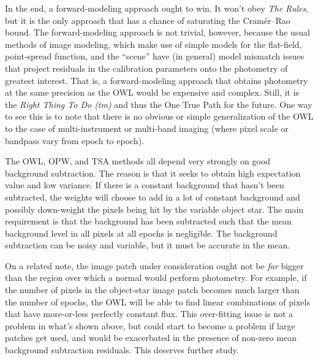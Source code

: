 \documentclass[12pt, letterpaper, preprint]{aastex}
\begin{document}
In the end, a forward-modeling approach ought to win.
It won't obey \emph{The Rules}, but it is the only approach that has a chance
  of saturating the Cram\'er--Rao bound.
The forward-modeling approach is not trivial, however,
  because the usual methods of image modeling,
  which make use of simple models for the flat-field, point-spread function,
  and the ``scene''
  have (in general) model mismatch issues that project residuals
  in the calibration parameters onto the photometry of greatest interest.
That is, a forward-modeling approach that obtains photometry at the same
  precision as the OWL would be expensive and complex.
Still, it is the \emph{Right Thing To Do (tm)} and thus the One True Path for the future.
One way to see this is to note that there is no obvious or simple generalization of the OWL
  to the case of multi-instrument or multi-band imaging
  (where pixel scale or bandpass vary from epoch to epoch).

The OWL, OPW, and TSA methods all depend very strongly on good background subtraction.
The reason is that it seeks to obtain high expectation value and low variance.
If there is a constant background that hasn't been subtracted,
  the weights will choose to add in a lot of constant background
  and possibly down-weight the pixels being hit by the variable object star.
The main requirement is that the background has been subtracted such
  that the mean background level in all pixels at all epochs is negligible.
The background subtraction can be noisy and variable,
  but it must be accurate in the mean.

On a related note, the image patch under consideration ought not be \emph{far}
  bigger than the region over which a normal would perform photometry.
For example, if the number of pixels in the object-star image patch becomes
  much larger than the number of epochs,
  the OWL will be able to find linear combinations of pixels that have
  more-or-less perfectly constant flux.
This over-fitting issue is not a problem in what's shown above,
  but could start to become a problem if large patches get used,
  and would be exacerbated in the presence of non-zero mean background subtraction residuals.
This deserves further study.
\end{document}
